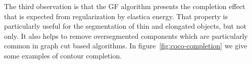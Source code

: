 \documentclass[smallextended]{svjour3}
\begin{document}
The third observation is that the GF algorithm presents the completion effect that is expected from regularization by elastica energy. That property is particularly useful for the segmentation of thin and elongated objects, but not only. It also helps to remove oversegmented components which are particularly common in graph cut based algorithms. In figure~\ref{fig:coco-completion} we give some examples of contour completion.
%
%
%
%
\begin{figure}
\center
{}


\end{figure}
\end{document}
